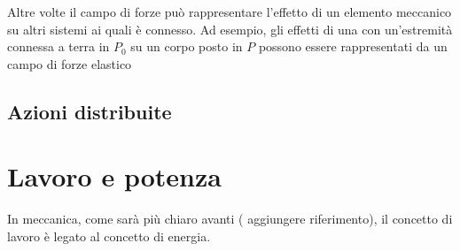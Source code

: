 \documentclass[letterpaper,10pt,italian]{jupyterBook}
\begin{document}
\sphinxAtStartPar
Altre volte il campo di forze può rappresentare l’effetto di un elemento meccanico su altri sistemi ai quali è connesso. Ad esempio, gli effetti di una  con un’estremità connessa a terra in \(P_0\) su un corpo posto in \(P\) possono essere rappresentati da un campo di forze elastico


\subsection{Azioni distribuite}
\label{\detokenize{ch/mechanics/actions-types:azioni-distribuite}}\label{\detokenize{ch/mechanics/actions-types:physics-hs-mechanics-actions-def-density}}
\sphinxAtStartPar
{}

\sphinxstepscope




\section{Lavoro e potenza}
\label{\detokenize{ch/mechanics/actions-work:lavoro-e-potenza}}\label{\detokenize{ch/mechanics/actions-work:physics-hs-mechanics-actions-work}}\label{\detokenize{ch/mechanics/actions-work::doc}}
\sphinxAtStartPar
In meccanica, come sarà più chiaro avanti ( aggiungere riferimento), il concetto di lavoro è legato al concetto di energia. 
\end{document}
